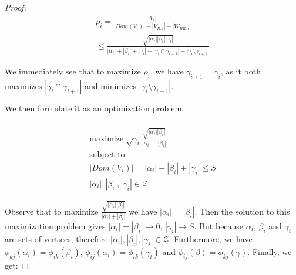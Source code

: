 \documentclass[sigplan,review,anonymous]{acmart}\settopmatter{printfolios=true,printccs=false,printacmref=false}
\begin{document}
\begin{proof}
\begin{gather}
\nonumber
\rho_i = \frac{|V_i|}{|Dom(V_i)| - |V_{R,i}| + |W_{BR,i}|} \\
\nonumber
\le 
\frac{\sqrt{|\alpha_i||\beta_i||\gamma_i|}}{|\alpha_i| + |\beta_i| + 
	|\gamma_i| - |\gamma_i \cap \gamma_{i+1}| +  |\gamma_i \setminus 
	\gamma_{i+1}|}
\end{gather}

We immediately see that to maximize $\rho_i$, we have $\gamma_{i+1} = 
\gamma_i$, as it both maximizes $|\gamma_i \cap 
\gamma_{i+1}|$ and minimizes $|\gamma_i \setminus \gamma_{i+1}|$.

 We then formulate it as an 
optimization problem:

%
%




\begin{multline}
\\
\text{maximize }
\sqrt{\gamma_i}\frac{\sqrt{|\alpha_i| |\beta_i|}}{|\alpha_i| + |\beta_i|}\\
\text{subject to: } \\
|Dom(V_i)| = |\alpha_i| + |\beta_i| + |\gamma_i| \le S \\
|\alpha_i|, |\beta_i|, |\gamma_i| \in \mathcal{Z} 
\end{multline}

Observe that to maximize $\frac{\sqrt{|\alpha_i| |\beta_i|}}{|\alpha_i| +
|\beta_i|}$ we have $|\alpha_i| = |\beta_i|$. Then the solution to this
maximization problem gives  $|\alpha_i| = |\beta_i| \rightarrow 0$, $|\gamma_i|
\rightarrow S$. But because $\alpha_i$, $\beta_i$ and $\gamma_i$ are sets of 
vertices, therefore $|\alpha_i|, |\beta_i|, |\gamma_i| \in \mathcal{Z}$.
Furthermore, we have $\phi_{kj}(\alpha_i) =
\phi_{ik}(\beta_i)$, $\phi_{ij}(\alpha_i) = \phi_{ik}(\gamma_i)$ and
$\phi_{ij}(\beta) = \phi_{kj}(\gamma)$. Finally, we get:


\end{proof}
\end{document}
